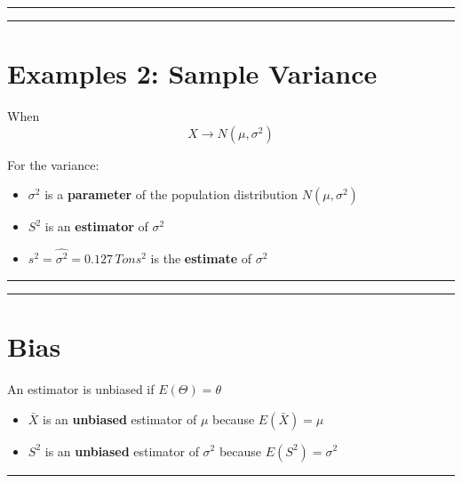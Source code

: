 \documentclass[
]{book}
\providecommand{\tightlist}{%
  \setlength{\itemsep}{0pt}\setlength{\parskip}{0pt}}
\begin{document}
\begin{center}\rule{0.5\linewidth}{0.5pt}\end{center}

\begin{center}\rule{0.5\linewidth}{0.5pt}\end{center}

\hypertarget{examples-2-sample-variance}{%
\section{Examples 2: Sample Variance}\label{examples-2-sample-variance}}

When \[X \rightarrow N(\mu, \sigma^2)\]

For the variance:

\begin{itemize}
\tightlist
\item
  \(\sigma^2\) is a \textbf{parameter} of the population distribution \(N(\mu, \sigma^2)\)
\item
  \(S^2\) is an \textbf{estimator} of \(\sigma^2\)
\item
  \(s^2=\hat{\sigma^2}=0.127 \, Tons^2\) is the \textbf{estimate} of \(\sigma^2\)
\end{itemize}

\begin{center}\rule{0.5\linewidth}{0.5pt}\end{center}

\begin{center}\rule{0.5\linewidth}{0.5pt}\end{center}

\hypertarget{bias}{%
\section{Bias}\label{bias}}

An estimator is unbiased if \(E(\Theta)=\theta\)

\begin{itemize}
\item
  \(\bar{X}\) is an \textbf{unbiased} estimator of \(\mu\) because \(E(\bar{X})=\mu\)
\item
  \(S^2\) is an \textbf{unbiased} estimator of \(\sigma^2\) because \(E(S^2)=\sigma^2\)
\end{itemize}

\begin{center}\rule{0.5\linewidth}{0.5pt}\end{center}
\end{document}
